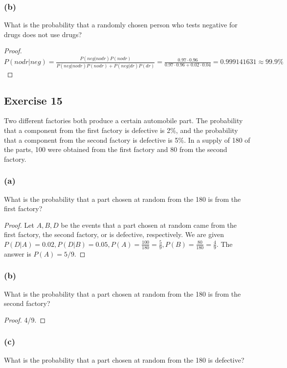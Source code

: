 \documentclass[14pt]{extarticle}
\begin{document}
\subsubsection{(b)}
What is the probability that a randomly chosen person who tests negative for drugs does not use drugs?

\begin{proof}
\(P(nodr|neg) = \frac{P(neg|nodr)P(nodr)}{P(neg|nodr) P(nodr) + P(neg|dr)P(dr)} = \frac{0.97 \cdot 0.96}{0.97 \cdot 0.96 + 0.02 \cdot 0.04} = 0.999141631 \approx 99.9\%\)
\end{proof}

\subsection{Exercise 15}
Two different factories both produce a certain automobile part. The probability that a component from the first factory 
is defective is 2\%, and the probability that a component from the second factory is defective is 5\%. In a supply of 180 of 
the parts, 100 were obtained from the first factory and 80 from the second factory.

\subsubsection{(a)}
What is the probability that a part chosen at random from the 180 is from the first factory?

\begin{proof}
Let \(A,B,D\) be the events that a part chosen at random came from the first factory, the second factory, or is defective,
respectively. We are given \(P(D|A) = 0.02, P(D|B) = 0.05, P(A) = \frac{100}{180} = \frac{5}{9}, P(B) = \frac{80}{180} = 
\frac{4}{9}\). The answer is \(P(A) = 5/9\).
\end{proof}

\subsubsection{(b)}
What is the probability that a part chosen at random from the 180 is from the second factory?

\begin{proof}
4/9.
\end{proof}

\subsubsection{(c)}
What is the probability that a part chosen at random from the 180 is defective?
\end{document}
